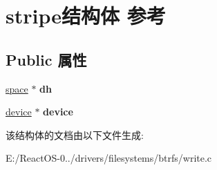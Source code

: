 \hypertarget{structstripe}{}\section{stripe结构体 参考}
\label{structstripe}
\subsection*{Public 属性}
\begin{DoxyCompactItemize}
\item 
\mbox{\label{structstripe_a862bcefbc4c94bef9cb03069d4152350}} 
\hyperlink{structspace}{space} $\ast$ {\bfseries dh}
\item 
\mbox{\label{structstripe_a025e78dc6e5aa8c97d732765d93d0278}} 
\hyperlink{structdevice}{device} $\ast$ {\bfseries device}
\end{DoxyCompactItemize}


该结构体的文档由以下文件生成\+:\begin{DoxyCompactItemize}
\item 
E\+:/\+React\+O\+S-\/0../drivers/filesystems/btrfs/write.\+c\end{DoxyCompactItemize}
